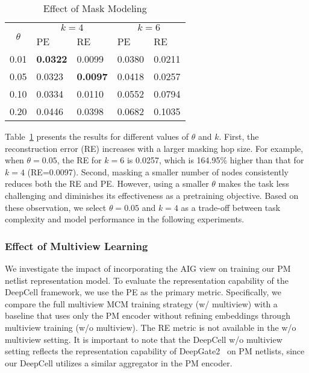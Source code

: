 \begin{table}[!t]
\caption{Effect of Mask Modeling} \label{TAB:mask}
\vspace{-5pt}
\centering
\begin{tabular}{@{}l|ll|ll@{}}
\toprule
\multicolumn{1}{c|}{\multirow{2}{*}{$\theta$}} & \multicolumn{2}{c|}{$k=4$}            & \multicolumn{2}{c}{$k=6$} \\
\multicolumn{1}{c|}{}                                                          & PE              & RE              & PE        & RE        \\ \midrule
0.01                                                                           & \textbf{0.0322} & 0.0099          & 0.0380    & 0.0211    \\
0.05                                                                           & 0.0323          & \textbf{0.0097} & 0.0418    & 0.0257    \\
0.10                                                                           & 0.0334          & 0.0110          & 0.0552    & 0.0794    \\
0.20                                                                           & 0.0446          & 0.0398          & 0.0682    & 0.1035    \\ \bottomrule
\end{tabular}
\end{table}

Table~\ref{TAB:mask} presents the results for different values of $\theta$ and $k$. First, the reconstruction error (RE) increases with a larger masking hop size. For example, when $\theta =0.05$, the RE for $k=6$ is 0.0257, which is 164.95\% higher than that for $k=4$ (RE=0.0097). Second, masking a smaller number of nodes consistently reduces both the RE and PE. However, using a smaller $\theta$ makes the task less challenging and diminishes its effectiveness as a pretraining objective. Based on these observation, we select $\theta=0.05$ and $k=4$ as a trade-off between task complexity and model performance in the following experiments. 

\subsubsection{Effect of Multiview Learning}
We investigate the impact of incorporating the AIG view on training our PM netlist representation model. To evaluate the representation capability of the DeepCell framework, we use the PE as the primary metric. Specifically, we compare the full multiview MCM training strategy (w/ multiview) with a baseline that uses only the PM encoder without refining embeddings through multiview training (w/o multiview). The RE metric is not available in the w/o multiview setting. It is important to note that the DeepCell w/o multiview setting reflects the representation capability of DeepGate2~\cite{shi2023deepgate2} on PM netlists, since our DeepCell utilizes a similar aggregator in the PM encoder. 

